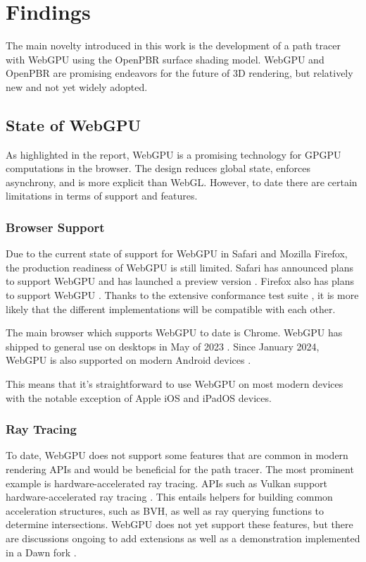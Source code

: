 \section{Findings}

The main novelty introduced in this work is the development of a path tracer with \gls{WebGPU} using the \gls{OpenPBR} surface shading model. \gls{WebGPU} and \gls{OpenPBR} are promising endeavors for the future of 3D rendering, but relatively new and not yet widely adopted.

\subsection*{State of WebGPU}

As highlighted in the report, \gls{WebGPU} is a promising technology for \gls{GPGPU} computations in the browser. The design reduces global state, enforces asynchrony, and is more explicit than \gls{WebGL}. However, to date there are certain limitations in terms of support and features.

\subsubsection*{Browser Support}

Due to the current state of support for \gls{WebGPU} in Safari and Mozilla Firefox, the production readiness of \gls{WebGPU} is still limited. Safari has announced plans to support \gls{WebGPU} and has launched a preview version \cite{SafariWebGPUSupport}. Firefox also has plans to support WebGPU \cite{FirefoxWebGPUSupport}. Thanks to the extensive conformance test suite \cite{WebGPUConformanceTestSuite}, it is more likely that the different implementations will be compatible with each other.

The main browser which supports \gls{WebGPU} to date is Chrome. \gls{WebGPU} has shipped to general use on desktops in May of 2023 \cite{ChromeWebGPUSupport}. Since January 2024, \gls{WebGPU} is also supported on modern Android devices \cite{ChromeAndroidWebGPUSupport}.

This means that it's straightforward to use \gls{WebGPU} on most modern devices with the notable exception of Apple iOS and iPadOS devices.

\subsubsection*{Ray Tracing}

To date, \gls{WebGPU} does not support some features that are common in modern rendering \glspl{API} and would be beneficial for the path tracer. The most prominent example is hardware-accelerated ray tracing. \glspl{API} such as Vulkan support hardware-accelerated ray tracing \cite{vulkanRayTracing}. This entails helpers for building common acceleration structures, such as \gls{BVH}, as well as ray querying functions to determine intersections. \gls{WebGPU} does not yet support these features, but there are discussions ongoing to add extensions \cite{webGPURayTracing} as well as a demonstration implemented in a Dawn fork \cite{webGPURayTracingFork}.

